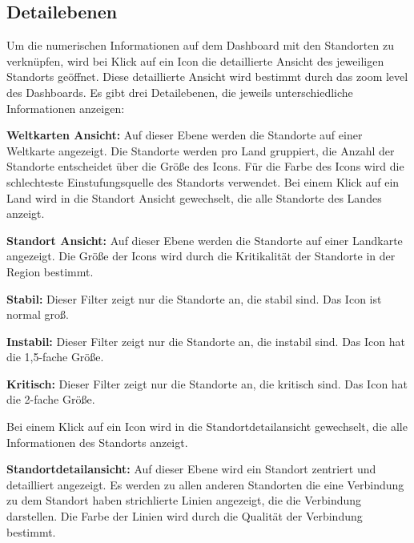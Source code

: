 \subsection{Detailebenen}
\label{subsec:detailebenen}
Um die numerischen Informationen auf dem Dashboard mit den Standorten zu verknüpfen, 
wird bei Klick auf ein Icon die detaillierte Ansicht des jeweiligen Standorts geöffnet.
Diese detaillierte Ansicht wird bestimmt durch das zoom level des Dashboards.
Es gibt drei Detailebenen, die jeweils unterschiedliche Informationen anzeigen:
\begin{compactitem}
    \item \textbf{Weltkarten Ansicht:} Auf dieser Ebene werden die Standorte auf einer Weltkarte angezeigt. 
    Die Standorte werden pro Land gruppiert, die Anzahl der Standorte entscheidet über die Größe des Icons.
    Für die Farbe des Icons wird die schlechteste Einstufungsquelle des Standorts verwendet.
    Bei einem Klick auf ein Land wird in die Standort Ansicht gewechselt, die alle Standorte des Landes anzeigt.
    \item \textbf{Standort Ansicht:} Auf dieser Ebene werden die Standorte auf einer Landkarte angezeigt.
    Die Größe der Icons wird durch die Kritikalität der Standorte in der Region bestimmt.

    \begin{compactitem}
        \item \textbf{Stabil:} Dieser Filter zeigt nur die Standorte an, die stabil sind. Das Icon ist normal groß.
        \item \textbf{Instabil:} Dieser Filter zeigt nur die Standorte an, die instabil sind. Das Icon hat die 1,5-fache Größe.
        \item \textbf{Kritisch:} Dieser Filter zeigt nur die Standorte an, die kritisch sind. Das Icon hat die 2-fache Größe.
    \end{compactitem}

    Bei einem Klick auf ein Icon wird in die Standortdetailansicht gewechselt, die alle Informationen des Standorts anzeigt.

    \begin{compactitem}
        \item \textbf{Standortdetailansicht:} Auf dieser Ebene wird ein Standort zentriert und detailliert angezeigt.
        \label{par:standort-detailansicht}
        Es werden zu allen anderen Standorten die eine Verbindung zu dem Standort haben strichlierte Linien angezeigt, 
        die die Verbindung darstellen.
        Die Farbe der Linien wird durch die Qualität der Verbindung bestimmt.


\end{compactitem}
\end{compactitem}
